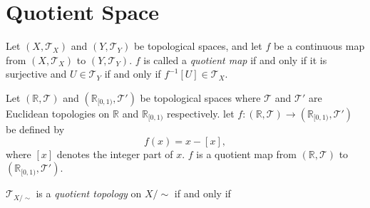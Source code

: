 \section{Quotient Space}


\begin{definition}
	Let $(X, \mathcal T_X)$ and $(Y, \mathcal T_Y)$ be topological spaces, and let $f$ be a continuous map from $(X, \mathcal T_X)$ to $(Y, \mathcal T_Y)$. $f$ is called a \textit{quotient map} if and only if it is surjective and $U \in \mathcal T_Y$ if and only if $f^{-1}[U] \in \mathcal T_X$.
\end{definition}


\begin{example}
	Let $(\mathbb R, \mathcal T)$ and $(\mathbb R_{[0,1)}, \mathcal T')$ be topological spaces where $\mathcal T$ and $\mathcal T'$ are Euclidean topologies on $\mathbb R$ and $\mathbb R_{[0,1)}$ respectively.
	let $f: (\mathbb R, \mathcal T) \to (\mathbb R_{[0,1)}, \mathcal T')$ be defined by
	$$
	f(x) = x - [x],
	$$
	where $[x]$ denotes the integer part of $x$. $f$ is a quotient map from $(\mathbb R, \mathcal T)$ to $(\mathbb R_{[0,1)}, \mathcal T')$.
\end{example}


\begin{definition}
	$\mathcal T_{X/\sim}$ is a \textit{quotient topology} on $X / \sim$ if and only if
\end{definition}






































%